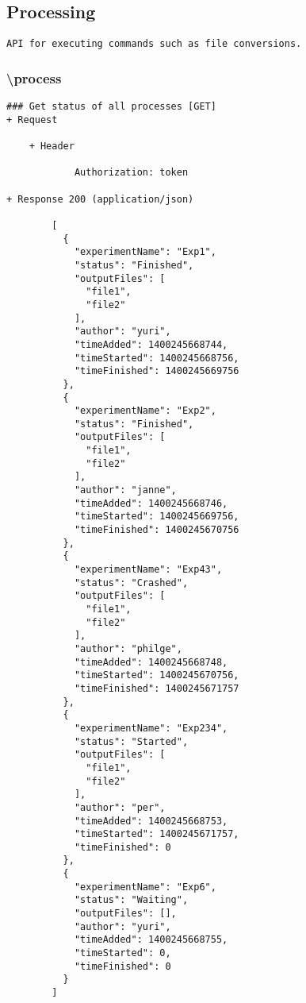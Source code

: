 \subsection*{Processing}
\begin{verbatim}
API for executing commands such as file conversions.
\end{verbatim}

\subsubsection*{\textbackslash process}
\begin{verbatim}
### Get status of all processes [GET]
+ Request

    + Header
    
            Authorization: token
            
+ Response 200 (application/json)

        [
          {
            "experimentName": "Exp1",
            "status": "Finished",
            "outputFiles": [
              "file1",
              "file2"
            ],
            "author": "yuri",
            "timeAdded": 1400245668744,
            "timeStarted": 1400245668756,
            "timeFinished": 1400245669756
          },
          {
            "experimentName": "Exp2",
            "status": "Finished",
            "outputFiles": [
              "file1",
              "file2"
            ],
            "author": "janne",
            "timeAdded": 1400245668746,
            "timeStarted": 1400245669756,
            "timeFinished": 1400245670756
          },
          {
            "experimentName": "Exp43",
            "status": "Crashed",
            "outputFiles": [
              "file1",
              "file2"
            ],
            "author": "philge",
            "timeAdded": 1400245668748,
            "timeStarted": 1400245670756,
            "timeFinished": 1400245671757
          },
          {
            "experimentName": "Exp234",
            "status": "Started",
            "outputFiles": [
              "file1",
              "file2"
            ],
            "author": "per",
            "timeAdded": 1400245668753,
            "timeStarted": 1400245671757,
            "timeFinished": 0
          },
          {
            "experimentName": "Exp6",
            "status": "Waiting",
            "outputFiles": [],
            "author": "yuri",
            "timeAdded": 1400245668755,
            "timeStarted": 0,
            "timeFinished": 0
          }
        ]
\end{verbatim}    
